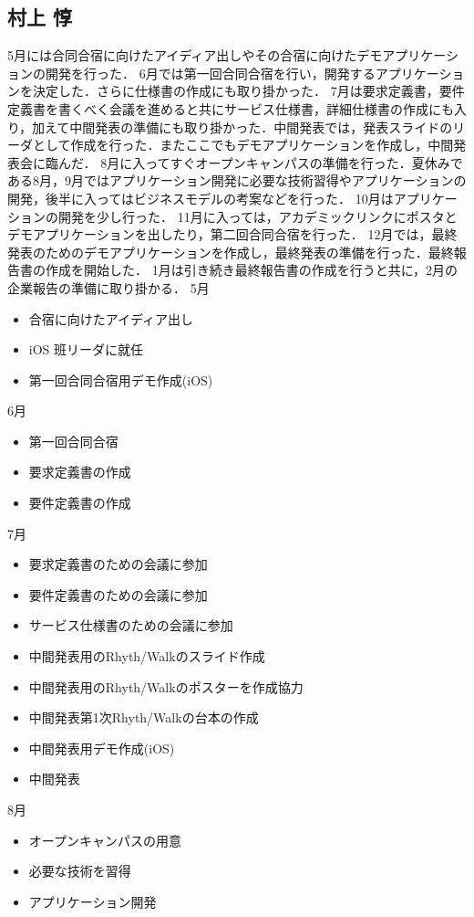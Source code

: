 \subsection{村上 惇}
\par
5月には合同合宿に向けたアイディア出しやその合宿に向けたデモアプリケーションの開発を行った．
6月では第一回合同合宿を行い，開発するアプリケーションを決定した．さらに仕様書の作成にも取り掛かった．
7月は要求定義書，要件定義書を書くべく会議を進めると共にサービス仕様書，詳細仕様書の作成にも入り，加えて中間発表の準備にも取り掛かった．中間発表では，発表スライドのリーダとして作成を行った．またここでもデモアプリケーションを作成し，中間発表会に臨んだ．
8月に入ってすぐオープンキャンパスの準備を行った．夏休みである8月，9月ではアプリケーション開発に必要な技術習得やアプリケーションの開発，後半に入ってはビジネスモデルの考案などを行った．
10月はアプリケーションの開発を少し行った．
11月に入っては，アカデミックリンクにポスタとデモアプリケーションを出したり，第二回合同合宿を行った．
12月では，最終発表のためのデモアプリケーションを作成し，最終発表の準備を行った．最終報告書の作成を開始した．
1月は引き続き最終報告書の作成を行うと共に，2月の企業報告の準備に取り掛かる．
5月
\begin{itemize}
\item 合宿に向けたアイディア出し
\item iOS 班リーダに就任
\item 第一回合同合宿用デモ作成(iOS)
\end{itemize}
6月
\begin{itemize}
\item 第一回合同合宿
\item 要求定義書の作成		　
\item 要件定義書の作成
\end{itemize}
7月
\begin{itemize}
\item 要求定義書のための会議に参加
\item 要件定義書のための会議に参加
\item サービス仕様書のための会議に参加
\item 中間発表用のRhyth/Walkのスライド作成
\item 中間発表用のRhyth/Walkのポスターを作成協力
\item 中間発表第1次Rhyth/Walkの台本の作成
\item 中間発表用デモ作成(iOS)
\item 中間発表
\end{itemize}
8月
\begin{itemize}
\item オープンキャンパスの用意
\item 必要な技術を習得
\item アプリケーション開発
\end{itemize}
